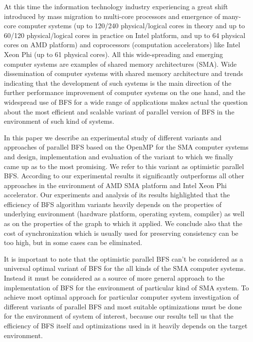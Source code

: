 \documentclass[letterpaper]{article}
\begin{document}
		At this time the information technology industry experiencing a great shift introduced by mass migration to multi-core processors and emergence of many-core computer systems (up to 120/240 physical/logical cores in theory and up to 60/120 physical/logical cores in practice on Intel platform, and up to 64 physical cores on AMD platform) and coprocessors (computation accelerators) like Intel Xeon Phi (up to 61 physical cores).
		All this wide-spreading and emerging computer systems are examples of shared memory architectures (SMA).
		Wide dissemination of computer systems with shared memory architecture and trends indicating that the development of such systems is the main direction of the further performance improvement of computer systems on the one hand, and the widespread use of BFS for a wide range of applications makes actual the question about the most efficient and scalable variant of parallel version of BFS in the environment of such kind of systems.
		
		In this paper we describe an experimental study of different variants and approaches of parallel BFS based on the OpenMP for the SMA computer systems and design, implementation and  evaluation of the variant to which we finally came up as to the most promising.
		We refer to this variant as optimistic parallel BFS.
		According to our experimental results it significantly outperforms all other approaches in the environment of AMD SMA platform and Intel Xeon Phi accelerator.
		Our experiments and analysis of its results highlighted that the efficiency of BFS algorithm variants heavily depends on the properties of underlying environment (hardware platform, operating system, compiler) as well as on the properties of the graph to which it applied.   
		We conclude also that the cost of synchronization which is usually used for preserving consistency can be too high, but in some cases can be eliminated.
		
		It is important to note that the optimistic parallel BFS can't be considered as a universal optimal variant of BFS for the all kinds of the SMA computer systems.
		Instead it must be considered as a source of more general approach to the implementation of BFS for the environment of particular kind of SMA system.
		To achieve most optimal approach for particular computer system investigation of different variants of parallel BFS and most suitable optimizations must be done for the environment of system of interest, because our results tell us that the efficiency of BFS itself and optimizations used in it heavily depends on the target environment. 
	
\end{document}
